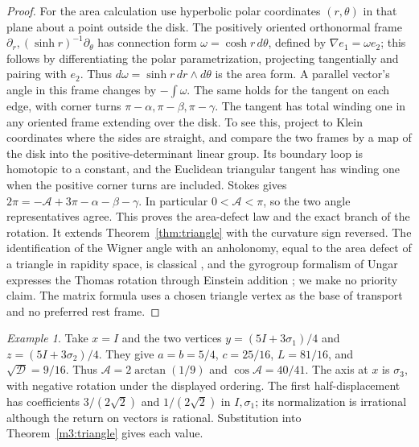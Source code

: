 \documentclass[11pt,reqno]{amsart}
\theoremstyle{definition}
\theoremstyle{remark}
\newtheorem{example}[theorem]{Example}
\numberwithin{equation}{section}
\begin{document}
\begin{proof}
For the area calculation use hyperbolic polar coordinates \((r,\theta)\)
in that plane about a point outside the disk. The positively oriented
orthonormal frame \(\partial_r,(\sinh r)^{-1}\partial_\theta\)
has connection form \(\omega=\cosh r\,d\theta\), defined by
\(\nabla e_1=\omega e_2\); this follows by differentiating the
polar parametrization, projecting tangentially and pairing with
\(e_2\). Thus \(d\omega=\sinh r\,dr\wedge d\theta\) is the area
form. A parallel vector's angle in this frame changes by
\(-\int\omega\). The same holds for the tangent on each edge,
with corner turns \(\pi-\alpha,\pi-\beta,\pi-\gamma\).
The tangent has total winding one in any oriented frame extending
over the disk. To see this, project to Klein coordinates where the
sides are straight, and compare the two frames by a map of the
disk into the positive-determinant linear group. Its boundary
loop is homotopic to a constant, and the Euclidean triangular
tangent has winding one when the positive corner turns are included.
Stokes gives \(2\pi=-\mathcal A+3\pi-\alpha-\beta-\gamma\).
In particular \(0<\mathcal A<\pi\), so the two angle representatives
agree. This proves the area-defect law and the exact branch of the
rotation. It extends Theorem~\ref{thm:triangle} with the curvature sign
reversed. The identification of the Wigner angle with an anholonomy, equal to the area defect of a triangle in rapidity space, is classical
\cite{m3Aravind,m3RhodesSemon}, and the gyrogroup formalism of Ungar expresses the Thomas rotation through Einstein addition
\cite{m3Ungar88,m3Ungar97}; we make no priority claim.  The matrix formula uses a chosen triangle vertex as the base of transport and no
preferred rest frame.
\end{proof}

\begin{example}\label{m3:triangleExample}
Take \(x=I\) and the two vertices
\(y=(5I+3\sigma_1)/4\) and \(z=(5I+3\sigma_2)/4\).
They give \(a=b=5/4\), \(c=25/16\), \(L=81/16\), and
\(\sqrt{\mathcal D}=9/16\). Thus
\(\mathcal A=2\arctan(1/9)\) and \(\cos\mathcal A=40/41\).
The axis at \(x\) is \(\sigma_3\), with negative rotation under
the displayed ordering. The first half-displacement has coefficients
\(3/(2\sqrt2)\) and \(1/(2\sqrt2)\) in \(I,\sigma_1\);
its normalization is irrational although the return on vectors
is rational. Substitution into Theorem~\ref{m3:triangle} gives
each value.
\end{example}
\end{document}

